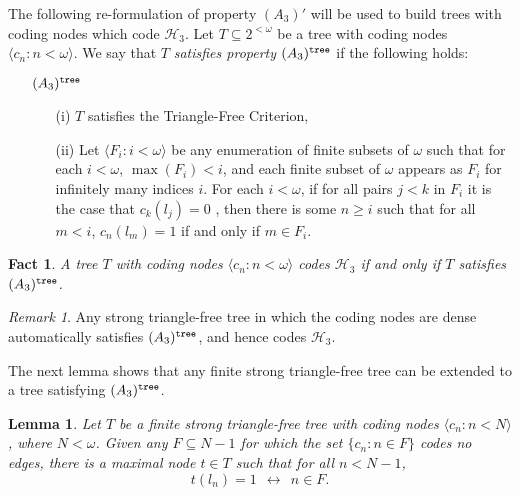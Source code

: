 \documentclass{amsart}
\newtheorem{lem}[thm]{Lemma}
\newtheorem{fact}[thm]{Fact}
\theoremstyle{remark}
\newtheorem{rem}[thm]{Remark}
\theoremstyle{definition}
\theoremstyle{remark}
\newcommand{\om}{\omega}
\newcommand{\sse}{\subseteq}
\newcommand{\lgl}{\langle}
\newcommand{\rgl}{\rangle}
\begin{document}
The following   re-formulation of  property $(A_3)'$  will be used  to build trees with coding nodes which code $\mathcal{H}_3$.
Let
$T\sse 2^{<\om}$  be a tree with coding  nodes $\lgl c_n:n<\om\rgl$.
We say that $T$ {\em satisfies property $(A_3)^{\tt tree}$} if the following holds:


\begin{enumerate}
\item[$(A_3)^{\tt{tree}}$]
\begin{enumerate}
\item[(i)]
$T$ satisfies the Triangle-Free Criterion,
\item[(ii)]
Let  $\lgl F_i:i<\om\rgl$   be any enumeration  of finite subsets of $\om$ such that
for each $i<\om$, $\max(F_i)<i$, and
 each finite subset of $\om$ appears as $F_i$ for infinitely many indices $i$.
For each $i<\om$,
if for all pairs $j<k$ in $F_i$
it is the case that
 $c_k(l_j)=0$ ,
then
there is some $n\ge i$ such that
for all $m<i$,
$c_n(l_m)=1$ if and only if $ m\in F_i$.
\end{enumerate}
\end{enumerate}


\begin{fact}\label{fact.A_3treeimpliestrianglefreegraph}
A tree  $T$  with coding nodes $\lgl c_n:n<\om\rgl$ codes $\mathcal{H}_3$  if and only if
$T$ satisfies $(A_3)^{\tt tree}$.
\end{fact}


\begin{rem}\label{rem.dense}
Any strong triangle-free tree in which the coding nodes are dense automatically satisfies $(A_3)^{\tt tree}$, and hence codes $\mathcal{H}_3$.
\end{rem}


The next lemma shows that any finite strong triangle-free tree can  be extended to a tree satisfying $(A_3)^{\tt tree}$.


\begin{lem}\label{lem.stftextension}
Let $T$ be a finite strong triangle-free tree with coding nodes $\lgl c_n:n<N\rgl$, where $N<\om$.
Given any $F\sse N-1$ for which the set $\{c_n:n\in F\}$ codes no edges,
there is a maximal node $t\in T$ such that
for all $n<N-1$,
\begin{equation}
t(l_n)=1\ \ \longleftrightarrow \ \ n\in F.
\end{equation}
\end{lem}
\end{document}
